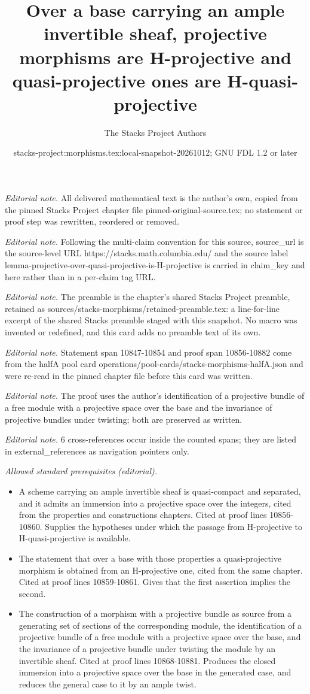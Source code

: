 \documentclass[10pt,a4paper]{amsart}
\title{Over a base carrying an ample invertible sheaf, projective morphisms are H-projective and quasi-projective ones are H-quasi-projective}
\author{The Stacks Project Authors}
\date{stacks-project:morphisms.tex:local-snapshot-20261012; GNU FDL 1.2 or later}
\theoremstyle{plain}
\theoremstyle{definition}
\theoremstyle{remark}
\numberwithin{equation}{subsection}
\begin{document}
\maketitle
\noindent\textit{Editorial note.} All delivered mathematical text is the author's own, copied from the pinned Stacks Project chapter file pinned-original-source.tex; no statement or proof step was rewritten, reordered or removed.\par\medskip
\noindent\textit{Editorial note.} Following the multi-claim convention for this source, source\_url is the source-level URL https://stacks.math.columbia.edu/ and the source label lemma-projective-over-quasi-projective-is-H-projective is carried in claim\_key and here rather than in a per-claim tag URL.\par\medskip
\noindent\textit{Editorial note.} The preamble is the chapter's shared Stacks Project preamble, retained as sources/stacks-morphisms/retained-preamble.tex: a line-for-line excerpt of the shared Stacks preamble staged with this snapshot. No macro was invented or redefined, and this card adds no preamble text of its own.\par\medskip
\noindent\textit{Editorial note.} Statement span 10847-10854 and proof span 10856-10882 come from the halfA pool card operations/pool-cards/stacks-morphisms-halfA.json and were re-read in the pinned chapter file before this card was written.\par\medskip
\noindent\textit{Editorial note.} The proof uses the author's identification of a projective bundle of a free module with a projective space over the base and the invariance of projective bundles under twisting; both are preserved as written.\par\medskip
\noindent\textit{Editorial note.} 6 cross-references occur inside the counted spans; they are listed in external\_references as navigation pointers only.\par\medskip
\noindent\textit{Allowed standard prerequisites (editorial).}\begin{itemize}
\item A scheme carrying an ample invertible sheaf is quasi-compact and separated, and it admits an immersion into a projective space over the integers, cited from the properties and constructions chapters. Cited at proof lines 10856-10860. Supplies the hypotheses under which the passage from H-projective to H-quasi-projective is available.
\item The statement that over a base with those properties a quasi-projective morphism is obtained from an H-projective one, cited from the same chapter. Cited at proof lines 10859-10861. Gives that the first assertion implies the second.
\item The construction of a morphism with a projective bundle as source from a generating set of sections of the corresponding module, the identification of a projective bundle of a free module with a projective space over the base, and the invariance of a projective bundle under twisting the module by an invertible sheaf. Cited at proof lines 10868-10881. Produces the closed immersion into a projective space over the base in the generated case, and reduces the general case to it by an ample twist.
\end{itemize}\medskip
\end{document}
